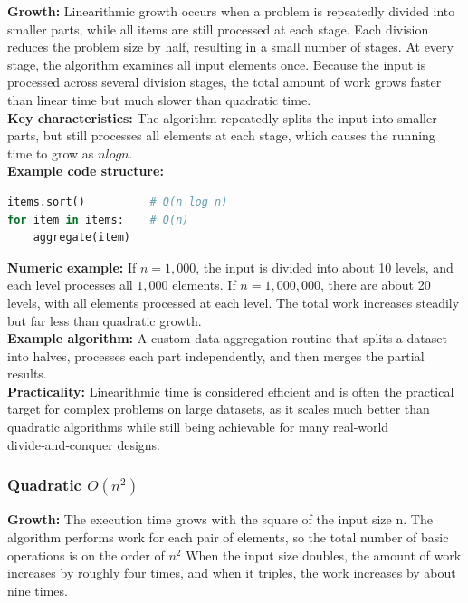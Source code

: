 \documentclass[12pt]{article}
\begin{document}
\textbf{Growth:}
Linearithmic growth occurs when a problem is repeatedly divided into smaller parts, while all items are still processed at each stage. Each division reduces the problem size by half, resulting in a small number of stages. At every stage, the algorithm examines all input elements once. Because the input is processed across several division stages, the total amount of work grows faster than linear time but much slower than quadratic time.\\

\noindent\textbf{Key characteristics:}
The algorithm repeatedly splits the input into smaller parts, but still processes all elements at each stage, which causes the running time to grow as $n log n$.\\

\noindent\textbf{Example code structure:}
\begin{lstlisting}[language=Python]
items.sort()          # O(n log n)
for item in items:    # O(n)
    aggregate(item)
\end{lstlisting}

\noindent\textbf{Numeric example:}
If $n = 1{,}000$, the input is divided into about 10 levels, and each level processes all $1{,}000$ elements. If $n = 1{,}000{,}000$, there are about 20 levels, with all elements processed at each level. The total work increases steadily but far less than quadratic growth.\\

\noindent\textbf{Example algorithm:}
A custom data aggregation routine that splits a dataset into halves, processes each part independently, and then merges the partial results.\\

\noindent\textbf{Practicality:}
Linearithmic time is considered efficient and is often the practical target for complex problems on large datasets, as it scales much better than quadratic algorithms while still being achievable for many real‑world divide‑and‑conquer designs.

\subsubsection{Quadratic $O(n^2)$}

\noindent\textbf{Growth:}
The execution time grows with the square of the input size n. The algorithm
performs work for each pair of elements, so the total number of basic operations is
on the order of $n^2$ When the input size doubles, the amount of work increases by
roughly four times, and when it triples, the work increases by about nine times.\\
\end{document}
